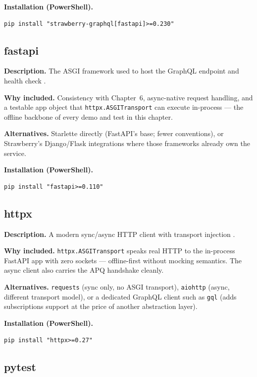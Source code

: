 \textbf{Installation (PowerShell).}
\begin{verbatim}
pip install "strawberry-graphql[fastapi]>=0.230"
\end{verbatim}

\subsection{fastapi}

\textbf{Description.} The ASGI framework used to host the GraphQL
endpoint and health check \cite{fastapidocs}.

\textbf{Why included.} Consistency with Chapter~6, async-native request
handling, and a testable app object that \texttt{httpx.ASGITransport}
can execute in-process --- the offline backbone of every demo and test
in this chapter.

\textbf{Alternatives.} Starlette directly (FastAPI's base; fewer
conventions), or Strawberry's Django/Flask integrations where those
frameworks already own the service.

\textbf{Installation (PowerShell).}
\begin{verbatim}
pip install "fastapi>=0.110"
\end{verbatim}

\subsection{httpx}

\textbf{Description.} A modern sync/async HTTP client with transport
injection \cite{httpxdocs}.

\textbf{Why included.} \texttt{httpx.ASGITransport} speaks real HTTP to
the in-process FastAPI app with zero sockets --- offline-first without
mocking semantics. The async client also carries the APQ handshake
cleanly.

\textbf{Alternatives.} \texttt{requests} (sync only, no ASGI transport),
\texttt{aiohttp} (async, different transport model), or a dedicated
GraphQL client such as \texttt{gql} (adds subscriptions support at the
price of another abstraction layer).

\textbf{Installation (PowerShell).}
\begin{verbatim}
pip install "httpx>=0.27"
\end{verbatim}

\subsection{pytest}

